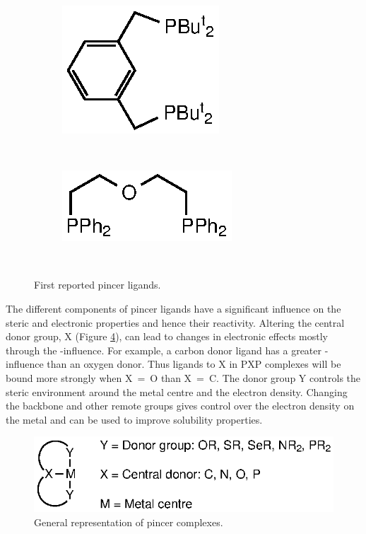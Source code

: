 \begin{figure}[htbp]
\centering
\begin{subfigure}[b]{0.3\textwidth}
	\centering
	\includegraphics{../Figures/Shaw.eps}
	\caption{}
	\label{ShawPCP}
\end{subfigure}
~
\begin{subfigure}[b]{0.3\textwidth}
	\centering
	\includegraphics{../Figures/Alcock.eps}
	\caption{}
	\label{AlcockPOP}
\end{subfigure}
\\
\caption[First reported pincer ligands]{First reported pincer ligands.}
\end{figure}

The different components of pincer ligands have a significant influence on the steric and electronic properties and hence their reactivity.\cite{Singleton2003}  Altering the central donor group, X (Figure \ref{Pincerligands}), can lead to changes in electronic effects mostly through the \trans{}-influence.\cite{Choi2011}  For example, a carbon donor ligand has a greater \trans{}-influence than an oxygen donor.  Thus ligands \trans{} to X in PXP complexes will be bound more strongly when X~=~O than X~=~C.\cite{Zhu2008} The donor group Y controls the steric environment around the metal centre and the electron density.  Changing the backbone and other remote groups gives control over the electron density on the metal and can be used to improve solubility properties.\cite{Choi2011}

\begin{figure}[htbp]
\centering
\includegraphics{../Figures/Pincerligands.eps}
\caption[General representation of pincer complexes]{General representation of pincer complexes.}
\label{Pincerligands}
\end{figure}

